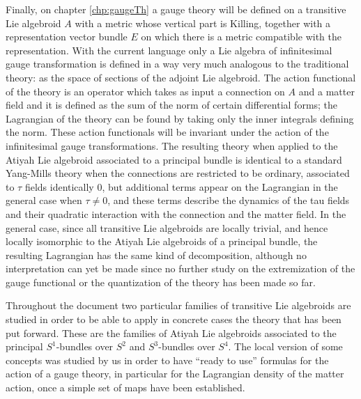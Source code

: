 Finally, on chapter \ref{chp:gaugeTh} a gauge theory will be defined on a transitive Lie algebroid $A$ with a metric whose vertical part is Killing, together with a representation vector bundle $E$ on which there is a metric compatible with the representation. With the current language only a Lie algebra of infinitesimal gauge transformation is defined in a way very much analogous to the traditional theory: as the space of sections of the adjoint Lie algebroid. The action functional of the theory is an operator which takes as input a connection on $A$ and a matter field and it is defined as the sum of the norm of certain differential forms; the Lagrangian of the theory can be found by taking only the inner integrals defining the norm. These action functionals will be invariant under the action of the infinitesimal gauge transformations. The resulting theory when applied to the Atiyah Lie algebroid associated to a principal bundle is identical to a standard Yang-Mills theory when the connections are restricted to be ordinary, associated to $\tau$ fields identically $0$, but additional terms appear on the Lagrangian in the general case when $\tau \neq 0$, and these terms describe the dynamics of the tau fields and their quadratic interaction with the connection and the matter field. In the general case, since all transitive Lie algebroids are locally trivial, and hence locally isomorphic to the Atiyah Lie algebroids of a principal bundle, the resulting Lagrangian has the same kind of decomposition, although no interpretation can yet be made since no further study on the extremization of the gauge functional or the quantization of the theory has been made so far.

Throughout the document two particular families of transitive Lie algebroids are studied in order to be able to apply in concrete cases the theory that has been put forward. These are the families of Atiyah Lie algebroids associated to the principal $S^1$-bundles over $S^2$ and $S^3$-bundles over $S^4$. The local version of some concepts was studied by us in order to have ``ready to use'' formulas for the action of a gauge theory, in particular for the Lagrangian density of the matter action, once a simple set of maps have been established.

